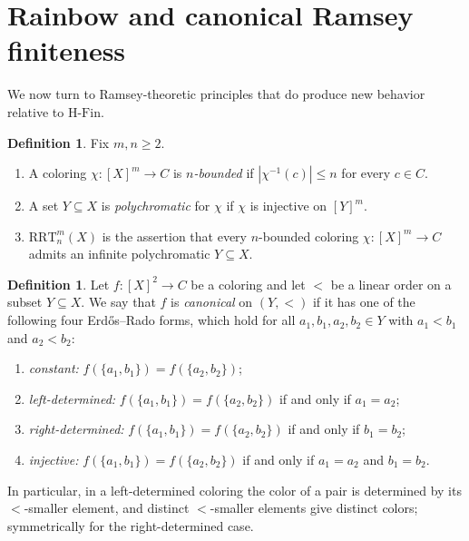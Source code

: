 \documentclass[11pt]{amsart}
\theoremstyle{definition}
\newtheorem{definition}[theorem]{Definition}
\newcommand{\HFin}{\mathrm{H\text{-}Fin}}
\newcommand{\RRT}{\mathrm{RRT}}
\begin{document}
\section{Rainbow and canonical Ramsey finiteness}\label{sec:rainbow}

We now turn to Ramsey-theoretic principles that do produce new behavior relative to \(\HFin\).

\begin{definition}
Fix \(m,n\geq 2\).
\begin{enumerate}[label=(\arabic*)]
    \item A coloring \(\chi:[X]^m\to C\) is \emph{\(n\)-bounded} if \(|\chi^{-1}(c)|\leq n\) for every \(c\in C\).
    \item A set \(Y\subseteq X\) is \emph{polychromatic} for \(\chi\) if \(\chi\) is injective on \([Y]^m\).
    \item \(\RRT^m_n(X)\) is the assertion that every \(n\)-bounded coloring \(\chi:[X]^m\to C\) admits an infinite polychromatic \(Y\subseteq X\).
\end{enumerate}
\end{definition}

\begin{definition}\label{def:canonical-forms}
Let \(f:[X]^2\to C\) be a coloring and let \(<\) be a linear order on a subset \(Y\subseteq X\).  We say that \(f\) is \emph{canonical} on \((Y,<)\) if it has one of the following four Erd\H{o}s--Rado forms, which hold for all \(a_1,b_1,a_2,b_2\in Y\) with \(a_1<b_1\) and \(a_2<b_2\):
\begin{enumerate}[label=(\alph*)]
    \item \emph{constant:} \(f(\{a_1,b_1\})=f(\{a_2,b_2\})\);
    \item \emph{left-determined:} \(f(\{a_1,b_1\})=f(\{a_2,b_2\})\) if and only if \(a_1=a_2\);
    \item \emph{right-determined:} \(f(\{a_1,b_1\})=f(\{a_2,b_2\})\) if and only if \(b_1=b_2\);
    \item \emph{injective:} \(f(\{a_1,b_1\})=f(\{a_2,b_2\})\) if and only if \(a_1=a_2\) and \(b_1=b_2\).
\end{enumerate}
In particular, in a left-determined coloring the color of a pair is determined by its \(<\)-smaller element, and distinct \(<\)-smaller elements give distinct colors; symmetrically for the right-determined case.
\end{definition}
\end{document}
